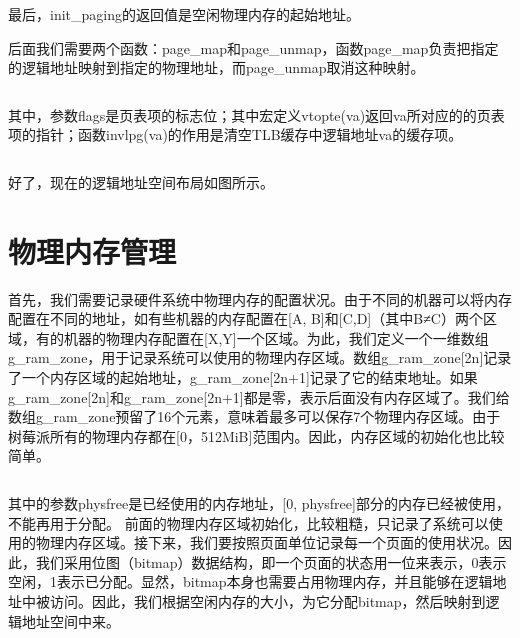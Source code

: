 \documentclass[main.tex]{subfiles}
\begin{document}
\begin{CJK*}{UTF8}{song}
\inputminted[firstline=182,lastline=205,linenos,numbersep=5pt,frame=lines,framesep=2mm]{c}{chapter04/kernel/machdep.c}

最后，init\_paging的返回值是空闲物理内存的起始地址。

后面我们需要两个函数：page\_map和page\_unmap，函数page\_map负责把指定的逻辑地址映射到指定的物理地址，而page\_unmap取消这种映射。

\inputminted[firstline=239,lastline=263,linenos,numbersep=5pt,frame=lines,framesep=2mm]{c}{chapter04/kernel/page.c}

其中，参数flags是页表项的标志位；其中宏定义vtopte(va)返回va所对应的的页表项的指针；函数invlpg(va)的作用是清空TLB缓存中逻辑地址va的缓存项。

\inputminted[firstline=59,lastline=60,linenos,numbersep=5pt,frame=lines,framesep=2mm]{c}{chapter04/kernel/kernel.h}

好了，现在的逻辑地址空间布局如图所示。

\section{物理内存管理}
首先，我们需要记录硬件系统中物理内存的配置状况。由于不同的机器可以将内存配置在不同的地址，如有些机器的内存配置在[A, B]和[C,D]（其中B≠C）两个区域，有的机器的物理内存配置在[X,Y]一个区域。为此，我们定义一个一维数组g\_ram\_zone，用于记录系统可以使用的物理内存区域。数组g\_ram\_zone[2n]记录了一个内存区域的起始地址，g\_ram\_zone[2n+1]记录了它的结束地址。如果g\_ram\_zone[2n]和g\_ram\_zone[2n+1]都是零，表示后面没有内存区域了。我们给数组g\_ram\_zone预留了16个元素，意味着最多可以保存7个物理内存区域。由于树莓派所有的物理内存都在[0，512MiB]范围内。因此，内存区域的初始化也比较简单。

\inputminted[firstline=207,lastline=216,linenos,numbersep=5pt,frame=lines,framesep=2mm]{c}{chapter04/kernel/machdep.c}

其中的参数physfree是已经使用的内存地址，[0, physfree]部分的内存已经被使用，不能再用于分配。
前面的物理内存区域初始化，比较粗糙，只记录了系统可以使用的物理内存区域。接下来，我们要按照页面单位记录每一个页面的使用状况。因此，我们采用位图（bitmap）数据结构，即一个页面的状态用一位来表示，0表示空闲，1表示已分配。显然，bitmap本身也需要占用物理内存，并且能够在逻辑地址中被访问。因此，我们根据空闲内存的大小，为它分配bitmap，然后映射到逻辑地址空间中来。

\inputminted[firstline=23,lastline=58,linenos,numbersep=5pt,frame=lines,framesep=2mm]{c}{chapter04/kernel/frame.c}


\end{CJK*}
\end{document}
